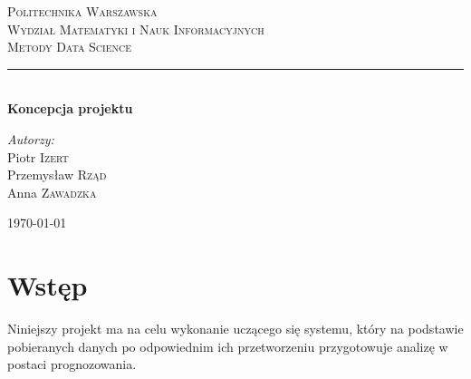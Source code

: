 \documentclass{article}
\begin{document}
	
\begin{titlepage}

\newcommand{\HRule}{\rule{\linewidth}{0.5mm}}

\center


\textsc{\LARGE Politechnika Warszawska}\\[5mm]
\textsc{\LARGE Wydział Matematyki i Nauk Informacyjnych}\\[4cm]
 

\textsc{\Huge Metody Data Science}\\[0.5cm]


\HRule \\[0.4cm]
{ \LARGE \bfseries Koncepcja projektu}\\[5.0cm]
 
 

\begin{flushright}
\Large \emph{Autorzy:}\\[0.5cm]
Piotr \textsc{Izert}\\
Przemysław \textsc{Rząd}\\
Anna \textsc{Zawadzka}\\
\end{flushright}


\vfill
{\large \today}\\[3cm]

\end{titlepage}
	
\newpage

\section{Wstęp}

Niniejszy projekt ma na celu wykonanie uczącego się systemu, który na podstawie pobieranych danych po odpowiednim ich przetworzeniu przygotowuje analizę w postaci prognozowania.

\end{document}

